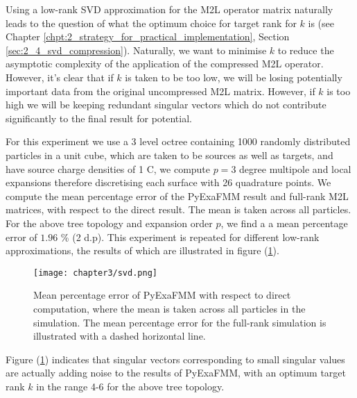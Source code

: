 Using a low-rank \gls{SVD} approximation for the \gls{M2L} operator matrix
naturally leads to the question of what the optimum choice for target rank for $k$
is (see Chapter \ref{chpt:2_strategy_for_practical_implementation}, Section \ref{sec:2_4_svd_compression}).
Naturally, we want to minimise $k$ to reduce the asymptotic complexity of
the application of the compressed \gls{M2L} operator. However, it's clear that
if $k$ is taken to be too low, we will be losing potentially important data
from the original uncompressed \gls{M2L} matrix. However, if $k$ is too high
we will be keeping redundant singular vectors which do not contribute significantly
to the final result for potential.

For this experiment we use a 3 level octree containing 1000 randomly distributed
particles in a unit cube, which are taken to be sources as well as targets, and
have source charge densities of 1 C, we compute $p=3$ degree multipole and
local expansions therefore discretising each surface with 26 quadrature points.
We compute the mean percentage error of the \gls{PyExaFMM} result and
full-rank \gls{M2L} matrices, with respect to the direct result.
The mean is taken across all particles. For the above
tree topology and expansion order $p$, we find a a mean percentage error of
$1.96$ \% (2 d.p). This experiment is repeated for different low-rank approximations,
the results of which are illustrated in figure (\ref{fig:3_2_svd}).

\begin{figure}[ht]
    \centering

  {\texttt{[image: chapter3/svd.png]}}
  \vspace{0pt}
    \caption{Mean percentage error of \gls{PyExaFMM} with respect to direct
    computation, where the mean is taken across all particles in the simulation.
    The mean percentage error for the full-rank simulation is illustrated with
    a dashed horizontal line.
    }
    \label{fig:3_2_svd}
\end{figure}

Figure (\ref{fig:3_2_svd}) indicates that singular vectors corresponding to small
singular values are actually adding noise to the results of \gls{PyExaFMM}, with
an optimum target rank $k$ in the range 4-6 for the above tree topology.
